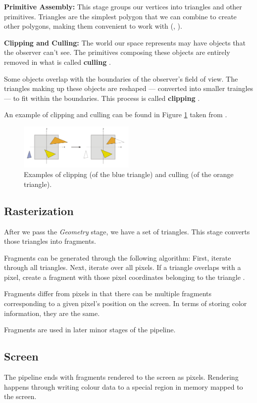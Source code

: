 \textbf{Primitive Assembly:}
This stage groups our vertices into triangles and other primitives.
Triangles are the simplest polygon that we can combine to create other polygons,
making them convenient to work with (\cite{wiki:overview}, \cite{scratchapixelRasterization}).

\textbf{Clipping and Culling:}
The world our space represents may have objects that the observer can't see.
The primitives composing these objects are entirely removed in what is called \textbf{culling} \cite{graphicscompendiumGraphicsCompendium}.

Some objects overlap with the boundaries of the observer's field of view. The
triangles making up these objects are reshaped --- converted into smaller traingles ---
to fit within the boundaries.
This process is called \textbf{clipping} \cite{graphicscompendiumGraphicsCompendium}.

An example of clipping and culling can be found in Figure \ref{fig:clip} taken from \cite{wiki:Graphics_pipeline}.

\begin{figure}[h]
    \centering
    \includegraphics[width=0.5\textwidth]{assets/Cube_clipping.svg.png}
    \caption{Examples of clipping (of the blue triangle) and culling (of the orange triangle). }
    \label{fig:clip}
\end{figure}

\subsection{Rasterization}

After we pass the \textit{Geometry} stage, we have a set of triangles.
This stage converts those triangles into fragments.

Fragments can be generated through the following algorithm:
First, iterate through all triangles. Next, iterate over all pixels.
If a triangle overlaps with a pixel, create a fragment with those pixel
coordinates belonging to the triangle \cite{scratchapixelRasterization}.

Fragments differ from pixels in that there can be multiple fragments corresponding
to a given pixel's position on the screen. In terms of storing color information,
they are the same.

Fragments are used in later minor stages of the pipeline.

\subsection{Screen}
The pipeline ends with fragments rendered to the screen as pixels.
Rendering happens through writing colour data to a special region in memory
mapped to the screen.
